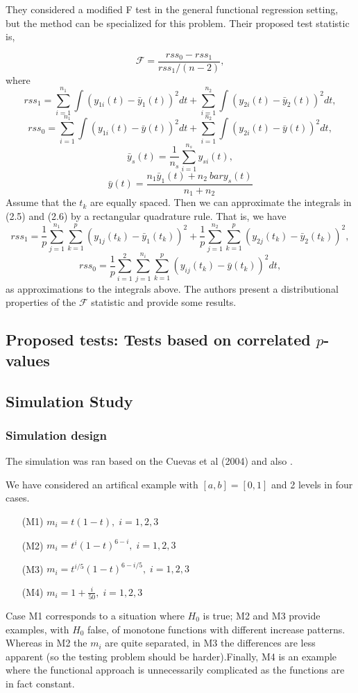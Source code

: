 \documentclass[12pt]{article}
\begin{document}
    They considered a modified F test in the general functional regression setting, but the method
    can be specialized for this problem. Their proposed test statistic is,

    \[\mathcal F = \frac{rss_0 - rss_1}{rss_1/(n-2)},\]
    where
        \[rss_1 = \sum_{i=1}^{n_1} \int (y_{1i}(t) - \bar{y}_1 (t))^2 dt + \sum_{i=1}^{n_2} \int (y_{2i}(t) - \bar{y}_2 (t))^2 dt,\]
       \[rss_0 = \sum_{i=1}^{n_1} \int (y_{1i}(t) - \bar{y} (t))^2 dt + \sum_{i=1}^{n_2} \int (y_{2i}(t) - \bar{y} (t))^2 dt,\]
        \[ \bar{y}_s (t) = \frac{1}{n_s} \sum_{i=1}^{n_s} y_{si}(t),\]
        \[ \bar{y}(t) = \frac{n_1\bar{y}_1(t) + n_2 \ bar{y}_s (t)}{n_1 + n_2}\]
  Assume that the $t_k$ are equally spaced. Then we can approximate the integrals in (2.5) and (2.6) by a rectangular quadrature rule.
  That is, we have
  \[rss_1 = \frac{1}{p} \sum_{j=1}^{n_1} \sum_{k=1}^{p} ( y_{1j}(t_k) - \bar{y}_1 (t_k) )^2
  + \frac{1}{p} \sum_{j=1}^{n_2} \sum_{k=1}^{p} ( y_{2j}(t_k) - \bar{y}_2 (t_k) )^2,\]
  \[rss_0 = \frac{1}{p} \sum_{i=1}^{2} \sum_{j=1}^{n_i} \sum_{k=1}^{p} ( y_{ij}(t_k) - \bar{y} (t_k) )^2  dt,\]
as approximations to the integrals above. The authors present a distributional properties of the
$\mathcal F$ statistic and provide some results.

\subsection{Proposed tests: Tests based on correlated $p$-values}


\subsection{Simulation Study}

\subsubsection{Simulation design}
The simulation was ran based on the Cuevas et al (2004) and also .

 We have considered an artifical example with $ [a,b]=[0,1]$ and 2 levels in four cases.
\begin{itemize}
 \item[(M1)] $m_i = t(1-t),\; i=1, 2, 3$
\item[(M2)] $m_i = t^i(1-t)^{6-i},\; i=1, 2, 3$
\item[(M3)] $m_i = t^{i/5}(1-t)^{6-{i/5}}, \;i=1, 2, 3$
\item[(M4)] $m_i = 1+\frac{i}{50},\; i=1, 2, 3$
\end{itemize}
Case M1 corresponds to a situation where $H_0$ is true; M2 and M3 provide examples, with $H_0$ false,
 of monotone functions with different increase patterns. Whereas in M2 the $m_i$ are quite separated,
 in M3 the differences are less apparent (so the testing problem should be harder).Finally, M4 is an
 example where the functional approach is unnecessarily complicated as the functions are in fact constant.
\end{document}
